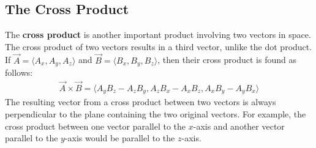 \documentclass[11pt]{article}
\begin{document}
\subsection{The Cross Product}
The \textbf{cross product} is another important product involving two vectors in space. The cross product of two vectors results in a third vector, unlike the dot product. If $\Vec{A} = \langle A_x, A_y, A_z\rangle$ and $\Vec{B} = \langle B_x, B_y, B_z\rangle$, then their cross product is found as follows:
\begin{align*}
    \Vec{A} \times \Vec{B} = \langle A_yB_z - A_zB_y, A_zB_x - A_xB_z, A_xB_y - A_yB_x \rangle
\end{align*}
The resulting vector from a cross product between two vectors is always perpendicular to the plane containing the two original vectors. For example, the cross product between one vector parallel to the $x$-axis and another vector parallel to the $y$-axis would be parallel to the $z$-axis.
\end{document}
